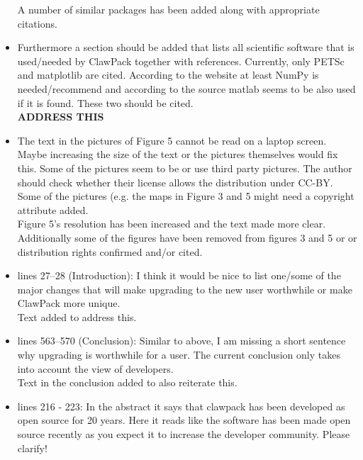 \documentclass{letter}
\newcommand{\alert}[1]{\textbf{\color{red} #1}}
\begin{document}
\begin{letter}
\begin{itemize}
    A number of similar packages has been added along with appropriate
    citations. \\

    \item Furthermore a section should be added that lists all scientific
    software that is used/needed by ClawPack together with
    references. Currently, only PETSc and matplotlib are cited. According
    to the website at least NumPy is needed/recommend and according to the
    source matlab seems to be also used if it is found. These two should
    be cited. \\

    \alert{ADDRESS THIS} \\

    \item The text in the pictures of Figure 5 cannot be read on a laptop
    screen. Maybe increasing the size of the text or the pictures
    themselves would fix this. Some of the pictures seem to be or use
    third party pictures. The author should check whether their license
    allows the distribution under CC-BY. Some of the pictures (e.g. the
    maps in Figure 3 and 5 might need a copyright attribute added. \\

    Figure 5's resolution has been increased and the text made more clear. 
    Additionally some of the figures have been removed from figures 3 and 5 or
    or distribution rights confirmed and/or cited. \\

    \item lines 27--28 (Introduction): I think it would be nice to list one/some
    of the major changes that will make upgrading to the new user worthwhile or
    make ClawPack more unique. \\

    Text added to address this. \\

    \item lines 563--570 (Conclusion): Similar to above, I am missing a short
    sentence why upgrading is worthwhile for a user. The current conclusion only
    takes into account the view of developers. \\

    Text in the conclusion added to also reiterate this. \\

    \item lines 216 - 223:  In the abstract it says that clawpack has been
    developed as open source for 20 years. Here it reads like the software has
    been made open source recently as you expect it to increase the developer
    community. Please clarify! \\


\end{itemize}
\end{letter}
\end{document}
